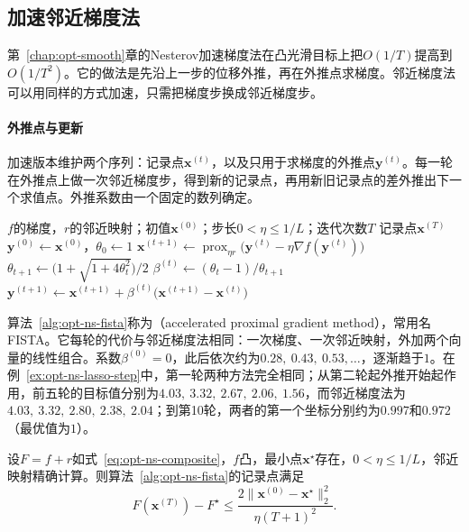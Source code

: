 \subsection{加速邻近梯度法}
\label{sec:opt-ns-fista}

第~\ref{chap:opt-smooth}章的Nesterov加速梯度法在凸光滑目标上把$O(1/T)$提高到$O(1/T^2)$。它的做法是先沿上一步的位移外推，再在外推点求梯度。邻近梯度法可以用同样的方式加速，只需把梯度步换成邻近梯度步。

\paragraph{外推点与更新}
加速版本维护两个序列：记录点$\bm x^{(t)}$，以及只用于求梯度的外推点$\bm y^{(t)}$。每一轮在外推点上做一次邻近梯度步，得到新的记录点，再用新旧记录点的差外推出下一个求值点。外推系数由一个固定的数列确定。

\begin{algorithm}
  \label{alg:opt-ns-fista}
  \begin{algorithmic}[1]
    \Require $f$的梯度，$r$的邻近映射；初值$\bm x^{(0)}$；步长$0<\eta\leq1/L$；迭代次数$T$
    \Ensure 记录点$\bm x^{(T)}$
    \State $\bm y^{(0)}\gets\bm x^{(0)}$，$\theta_0\gets1$
      \State $\bm x^{(t+1)}\gets\operatorname{prox}_{\eta r}\bigl(\bm y^{(t)}-\eta\nabla f(\bm y^{(t)})\bigr)$ 
      \State $\theta_{t+1}\gets\bigl(1+\sqrt{1+4\theta_t^2}\bigr)/2$
      \State $\beta^{(t)}\gets(\theta_t-1)/\theta_{t+1}$
      \State $\bm y^{(t+1)}\gets\bm x^{(t+1)}+\beta^{(t)}\bigl(\bm x^{(t+1)}-\bm x^{(t)}\bigr)$ 
    \EndFor
  \end{algorithmic}
\end{algorithm}

算法~\ref{alg:opt-ns-fista}称为（accelerated proximal gradient method），常用名FISTA。它每轮的代价与邻近梯度法相同：一次梯度、一次邻近映射，外加两个向量的线性组合。系数$\beta^{(0)}=0$，此后依次约为$0.28,\ 0.43,\ 0.53,\dots$，逐渐趋于$1$。在例~\ref{ex:opt-ns-lasso-step}中，第一轮两种方法完全相同；从第二轮起外推开始起作用，前五轮的目标值分别为$4.03,\ 3.32,\ 2.67,\ 2.06,\ 1.56$，而邻近梯度法为$4.03,\ 3.32,\ 2.80,\ 2.38,\ 2.04$；到第10轮，两者的第一个坐标分别约为$0.997$和$0.972$（最优值为$1$）。

\begin{theorem}[加速邻近梯度法的目标差]
\label{thm:opt-ns-fista}
设$F=f+r$如式~\eqref{eq:opt-ns-composite}，$f$凸，最小点$\bm x^\star$存在，$0<\eta\leq1/L$，邻近映射精确计算。则算法~\ref{alg:opt-ns-fista}的记录点满足
\[
 F(\bm x^{(T)})-F^\star\leq\frac{2\lVert\bm x^{(0)}-\bm x^\star\rVert_2^2}{\eta(T+1)^2}.
\]
\end{theorem}

